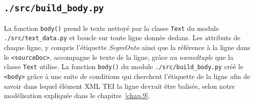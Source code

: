 \documentclass[class=article, crop=false]{standalone}
\begin{document}
\subsection{\texttt{./src/build\_body.py}}
La fonction \texttt{body()} prend le texte nettoyé par la classe \texttt{Text} du module \texttt{./src/text\_data.py} et boucle sur toute ligne donnée dedans. Les attributs de chaque ligne, y compris l'étiquette \textit{SegmOnto} ainsi que la référence à la ligne dans le \texttt{<sourceDoc>}, accompagne le texte de la ligne, grâce au \textit{namedtuple} que la classe \texttt{Text} utilise. La fonction \texttt{body()} du module \texttt{./src/build\_body.py} créé le \texttt{<body>} grâce à une suite de conditions qui cherchent l'étiquette de la ligne afin de savoir dans lequel élément \acrshort{XML} \acrshort{TEI} la ligne devrait être balisée, selon notre modélisation expliquée dans le chapitre~\ref{chap.9}.
\end{document}
